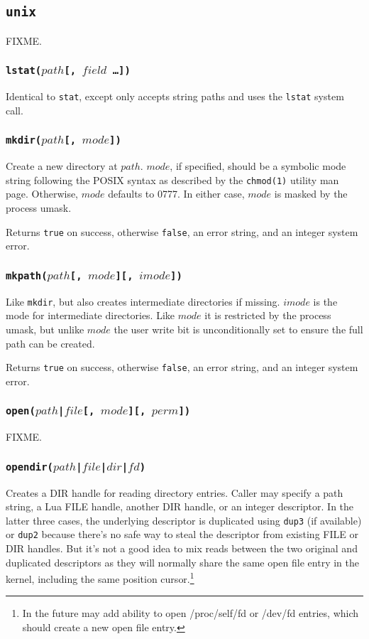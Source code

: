 \documentclass[11pt, oneside]{memoir}
\newcommand*{\true}[0]{\texttt{true}\xspace}
\newcommand*{\false}[0]{\texttt{false}\xspace}
\newcommand*{\syscall}[1]{\texttt{#1}\xspace}
\newcommand*{\fn}[1]{\texttt{#1}\xspace}
\newcounter{toccols}
\newenvironment{Module}[1]{
	\subsection{\texttt{#1}}
	\addtocontents{toc}{
		\protect\begin{multicols}{\value{toccols}}
	}
}{
	\addtocontents{toc}{\protect\end{multicols}}
}
\begin{document}
\begin{Module}{unix}
FIXME.

\subsubsection[\fn{lstat}]{\fn{lstat($path$[, $field$ \ldots])}}

Identical to \fn{stat}, except only accepts string paths and uses the \syscall{lstat} system call.

\subsubsection[\fn{mkdir}]{\fn{mkdir($path$[, $mode$])}}

Create a new directory at $path$. $mode$, if specified, should be a symbolic mode string following the POSIX syntax as described by the \texttt{chmod(1)} utility man page. Otherwise, $mode$ defaults to 0777. In either case, $mode$ is masked by the process umask.

Returns \true on success, otherwise \false, an error string, and an integer system error.

\subsubsection[\fn{mkpath}]{\fn{mkpath($path$[, $mode$][, $imode$])}}

Like \fn{mkdir}, but also creates intermediate directories if missing. $imode$ is the mode for intermediate directories. Like $mode$ it is restricted by the process umask, but unlike $mode$ the user write bit is unconditionally set to ensure the full path can be created.

Returns \true on success, otherwise \false, an error string, and an integer system error.

\subsubsection[\fn{open}]{\fn{open($path$|$file$[, $mode$][, $perm$])}}

FIXME.

\subsubsection[\fn{opendir}]{\fn{opendir($path$|$file$|$dir$|$fd$)}}

Creates a DIR handle for reading directory entries. Caller may specify a path string, a Lua FILE handle, another DIR handle, or an integer descriptor. In the latter three cases, the underlying descriptor is duplicated using \syscall{dup3} (if available) or \syscall{dup2} because there's no safe way to steal the descriptor from existing FILE or DIR handles. But it's not a good idea to mix reads between the two original and duplicated descriptors as they will normally share the same open file entry in the kernel, including the same position cursor.\footnote{In the future may add ability to open /proc/self/fd or /dev/fd entries, which should create a new open file entry.}


\end{Module}
\end{document}
